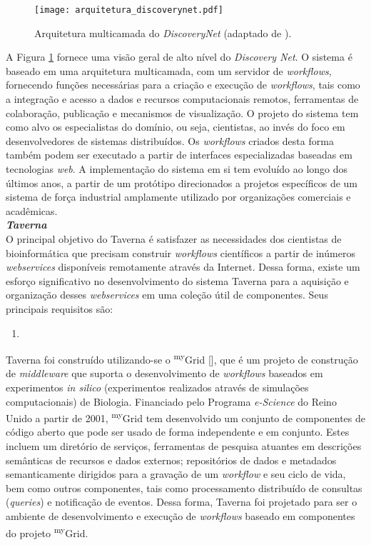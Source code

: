 \begin{figure}[ht]
	\centering
	\texttt{[image: arquitetura\_discoverynet.pdf]}
	\caption{Arquitetura multicamada do \textit{DiscoveryNet} (adaptado de \cite{can_one_size_fit_all}).}
	\label{fig:arquitetura_discoverynet}
\end{figure}  
    
A Figura \ref{fig:arquitetura_discoverynet} fornece uma visão geral de alto nível do \textit{Discovery Net}. O sistema é baseado em uma arquitetura multicamada, com um servidor de \textit{workflows}, fornecendo funções necessárias para a criação e execução de \textit{workflows}, tais como a integração e acesso a dados e recursos computacionais remotos, ferramentas de colaboração, publicação e mecanismos de visualização. O projeto do sistema tem como alvo os especialistas do domínio, ou seja, cientistas, ao invés do foco em desenvolvedores de sistemas distribuídos. Os \textit{workflows} criados desta forma também podem ser executado a partir de interfaces especializadas baseadas em tecnologias \textit{web}. A implementação do sistema em si tem evoluído ao longo dos últimos anos, a partir de um protótipo direcionados a projetos específicos de um sistema de força industrial amplamente utilizado por organizações comerciais e acadêmicas. \\

\noindent
\textbf{\textit{Taverna}} \\

\noindent
O principal objetivo do Taverna é satisfazer as necessidades dos cientistas de bioinformática que precisam construir \textit{workflows} científicos a partir de inúmeros \textit{webservices} disponíveis remotamente através da Internet. Dessa forma, existe um esforço significativo no desenvolvimento do sistema Taverna para a aquisição e organização desses \textit{webservices} em uma coleção útil de componentes. Seus principais requisitos são:
    
    \begin{enumerate}
		\item 
	\end{enumerate}

Taverna foi construído utilizando-se o \textsuperscript{my}Grid [], que é um projeto de construção de \textit{middleware} que suporta o desenvolvimento de \textit{workflows} baseados em experimentos \textit{in silico} (experimentos realizados através de simulações computacionais) de Biologia. Financiado pelo Programa \textit{e-Science} do Reino Unido a partir de 2001, \textsuperscript{my}Grid tem desenvolvido um conjunto de componentes de código aberto que pode ser usado de forma independente e em conjunto. Estes incluem um diretório de serviços, ferramentas de pesquisa atuantes em descrições semânticas de recursos e dados externos; repositórios de dados e metadados semanticamente dirigidos para a gravação de um \textit{workflow} e seu ciclo de vida, bem como outros componentes, tais como processamento distribuído de consultas (\textit{queries}) e notificação de eventos. Dessa forma, Taverna foi projetado para ser o ambiente de desenvolvimento e execução de \textit{workflows} baseado em componentes do projeto \textsuperscript{my}Grid.

